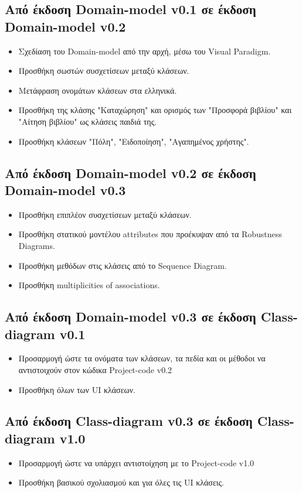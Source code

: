 \documentclass[12pt,a4paper]{article}
\begin{document}
\subsection{Από έκδοση Domain-model v0.1 σε έκδοση Domain-model v0.2}
\begin{itemize}
    \item Σχεδίαση του Domain-model από την αρχή, μέσω του Visual Paradigm.
    \item Προσθήκη σωστών συσχετίσεων μεταξύ κλάσεων.
    \item Μετάφραση ονομάτων κλάσεων στα ελληνικά.
    \item Προσθήκη της κλάσης "Καταχώρηση" και ορισμός των "Προσφορά βιβλίου" και "Αίτηση βιβλίου" ως κλάσεις παιδιά της.
    \item Προσθήκη κλάσεων "Πόλη", "Ειδοποίηση", "Αγαπημένος χρήστης".
\end{itemize}

\subsection{Από έκδοση Domain-model v0.2 σε έκδοση Domain-model v0.3}
\begin{itemize}
    \item Προσθήκη επιπλέον συσχετίσεων μεταξύ κλάσεων.
    \item Προσθήκη στατικού μοντέλου attributes που προέκυψαν από τα Robustness Diagrams.
    \item Προσθήκη μεθόδων στις κλάσεις από το Sequence Diagram.
    \item Προσθήκη multiplicities of associations.
\end{itemize}

\subsection{Από έκδοση Domain-model v0.3 σε έκδοση Class-diagram v0.1}
\begin{itemize}
    \item Προσαρμογή ώστε τα ονόματα των κλάσεων, τα πεδία και οι μέθοδοι να αντιστοιχούν στον κώδικα Project-code v0.2
    \item Προσθήκη όλων των UI κλάσεων.
\end{itemize}

\subsection{Από έκδοση Class-diagram v0.3 σε έκδοση Class-diagram v1.0}
\begin{itemize}
    \item Προσαρμογή ώστε να υπάρχει αντιστοίχηση με το Project-code v1.0
    \item Προσθήκη βασικού σχολιασμού και για όλες τις UI κλάσεις.
\end{itemize}
\end{document}
